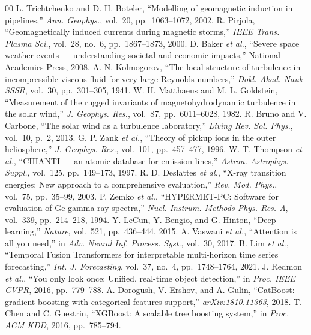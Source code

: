 \documentclass[conference,10pt,twocolumn]{IEEEtran}
\begin{document}
\begin{thebibliography}{00}
 L. Trichtchenko and D. H. Boteler, ``Modelling of geomagnetic induction in pipelines,'' \textit{Ann. Geophys.}, vol.~20, pp.~1063--1072, 2002.
 R. Pirjola, ``Geomagnetically induced currents during magnetic storms,'' \textit{IEEE Trans. Plasma Sci.}, vol.~28, no.~6, pp.~1867--1873, 2000.
 D. Baker \textit{et al.}, ``Severe space weather events --- understanding societal and economic impacts,'' National Academies Press, 2008.
 A. N. Kolmogorov, ``The local structure of turbulence in incompressible viscous fluid for very large Reynolds numbers,'' \textit{Dokl. Akad. Nauk SSSR}, vol.~30, pp.~301--305, 1941.
 W. H. Matthaeus and M. L. Goldstein, ``Measurement of the rugged invariants of magnetohydrodynamic turbulence in the solar wind,'' \textit{J. Geophys. Res.}, vol.~87, pp.~6011--6028, 1982.
 R. Bruno and V. Carbone, ``The solar wind as a turbulence laboratory,'' \textit{Living Rev. Sol. Phys.}, vol.~10, p.~2, 2013.
 G. P. Zank \textit{et al.}, ``Theory of pickup ions in the outer heliosphere,'' \textit{J. Geophys. Res.}, vol.~101, pp.~457--477, 1996.
 W. T. Thompson \textit{et al.}, ``CHIANTI --- an atomic database for emission lines,'' \textit{Astron. Astrophys. Suppl.}, vol.~125, pp.~149--173, 1997.
 R. D. Deslattes \textit{et al.}, ``X-ray transition energies: New approach to a comprehensive evaluation,'' \textit{Rev. Mod. Phys.}, vol.~75, pp.~35--99, 2003.
 P. Zemko \textit{et al.}, ``HYPERMET-PC: Software for evaluation of Ge gamma-ray spectra,'' \textit{Nucl. Instrum. Methods Phys. Res. A}, vol.~339, pp.~214--218, 1994.
 Y. LeCun, Y. Bengio, and G. Hinton, ``Deep learning,'' \textit{Nature}, vol.~521, pp.~436--444, 2015.
 A. Vaswani \textit{et al.}, ``Attention is all you need,'' in \textit{Adv. Neural Inf. Process. Syst.}, vol.~30, 2017.
 B. Lim \textit{et al.}, ``Temporal Fusion Transformers for interpretable multi-horizon time series forecasting,'' \textit{Int. J. Forecasting}, vol.~37, no.~4, pp.~1748--1764, 2021.
 J. Redmon \textit{et al.}, ``You only look once: Unified, real-time object detection,'' in \textit{Proc. IEEE CVPR}, 2016, pp.~779--788.
 A. Dorogush, V. Ershov, and A. Gulin, ``CatBoost: gradient boosting with categorical features support,'' \textit{arXiv:1810.11363}, 2018.
 T. Chen and C. Guestrin, ``XGBoost: A scalable tree boosting system,'' in \textit{Proc. ACM KDD}, 2016, pp.~785--794.

\end{thebibliography}
\end{document}
